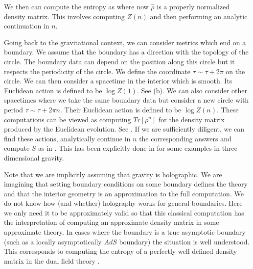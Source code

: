 We then can compute the entropy as
\eqn{}
 where now $\hat \rho$ is a properly normalized density matrix. This involves computing $Z(n)$ and then performing
 an analytic continuation in $n$.

\ifig{} {}

 Going back to the gravitational context, we can consider metrics which end on a boundary.
 We assume that the boundary has a direction with the topology of the circle. The boundary data can depend
 on the position along this circle but it respects the periodicity of the circle. We define
  the coordinate $\tau \sim \tau + 2 \pi$ on the circle.
   We can then consider a spacetime
 in the interior which is smooth. Its Euclidean action is defined to be $\log Z(1)$. See \densitymatrices (b).
  We can also consider other spacetimes where we take the same boundary data but consider
 a new circle with period $\tau \sim \tau + 2 \pi n $. Their Euclidean action is defined to be $\log Z(n)$.
 These computations can be viewed as computing $Tr[\rho^n]$ for the density matrix   produced by the
 Euclidean evolution.  See \Replica .
 If we are sufficiently diligent, we can find these actions, analytically continue in $n$ the
 corresponding answers and compute $S$ as in \entrog . This has been explicitly done in    for
 some examples in three dimensional gravity.

Note that we are implicitly assuming that gravity is holographic. We are imagining that setting boundary
conditions on some boundary defines the theory and that the interior geometry is an  approximation
to the full computation. We do not know how (and whether) holography works for general boundaries. Here we only
need it to be approximately valid so that this classical computation has the interpretation of computing an approximate density
matrix in some approximate theory.
In cases where the boundary is a true asymptotic boundary (such as a locally asymptotically $AdS$ boundary)
the situation is well understood.
 This corresponds to computing the entropy of a perfectly well defined density matrix in
the dual field theory .


